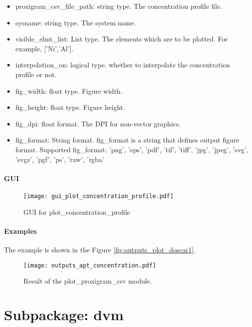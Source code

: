 \documentclass[12pt]{book}
\begin{document}
\begin{itemize}
\item proxigram\_csv\_file\_path: string type. The concentration profile file.
\item sysname: string type. The system name.
\item visible\_elmt\_list: List type. The elements which are to be plotted. For example, ['Ni','Al'].
\item interpolation\_on: logical type. whether to interpolate the concentration profile or not.
\item fig\_width: float type. Figure width.
\item fig\_height: float type. Figure height.
\item fig\_dpi: float format. The DPI for non-vector graphics.
\item fig\_format: String format. fig\_format is a string that defines output figure format. Supported fig\_format: 'png', 'eps', 'pdf', 'tif', 'tiff', 'jpg', 'jpeg', 'svg', 'svgz', 'pgf', 'ps', 'raw', 'rgba'
\end{itemize}

\subsubsection{GUI}

\begin{figure}[htbp]
\centering
\texttt{[image: gui\_plot\_concentration\_profile.pdf]}
\caption{GUI for plot\_concentration\_profile}
\label{fig:GUI_gui_plot_concentration_profile}
\end{figure}

\subsubsection{Examples}

The example is shown in the Figure \ref{fig:outputs_plot_doscar1}.

\begin{figure}[htbp]
\centering
\texttt{[image: outputs\_apt\_concentration.pdf]}
\caption{Result of the plot\_proxigram\_csv module.}
\label{fig:outputs_apt_concentration}
\end{figure}


\chapter{Subpackage: dvm}
\end{document}
